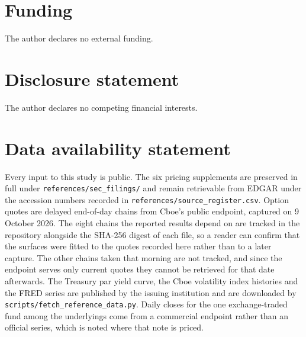%
%

\section*{Funding}
The author declares no external funding.

\section*{Disclosure statement}
The author declares no competing financial interests.

\section*{Data availability statement}
Every input to this study is public. The six pricing supplements are preserved
in full under \texttt{references/sec\_filings/} and remain retrievable from
EDGAR under the accession numbers recorded in
\texttt{references/source\_register.csv}. Option quotes are delayed end-of-day
chains from Cboe's public endpoint, captured on 9 October 2026. The eight chains
the reported results depend on are tracked in the repository alongside the
SHA-256 digest of each file, so a reader can confirm that the surfaces were
fitted to the quotes recorded here rather than to a later capture. The other
chains taken that morning are not tracked, and since the endpoint serves only
current quotes they cannot be retrieved for that date afterwards. The Treasury
par yield curve, the Cboe volatility index histories and the FRED series are
published by the issuing institution and are downloaded by
\texttt{scripts/fetch\_reference\_data.py}. Daily closes for the one
exchange-traded fund among the underlyings come from a commercial endpoint
rather than an official series, which is noted where that note is priced.

